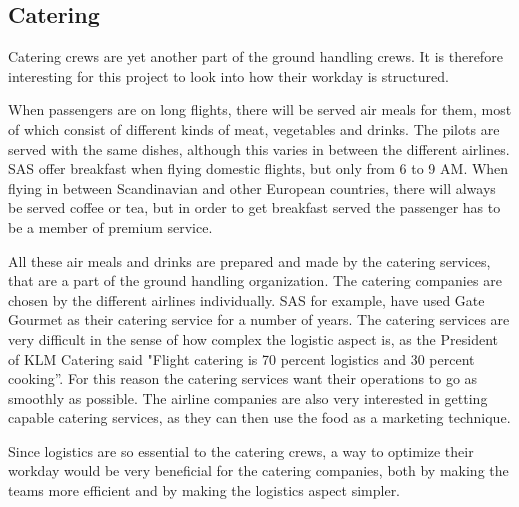 \subsection{Catering} 
Catering crews are yet another part of the ground handling crews. It is therefore interesting for this project to look into how their workday is structured.

When passengers are on long flights, there will be served air meals for them, most of which consist of different kinds of meat, vegetables and drinks. The pilots are served with the same dishes, although this varies in between the different airlines\cite{cate_pilotfood1}\cite{cate_pilotfood2}. SAS offer breakfast when flying domestic flights, but only from 6 to 9 AM\cite{cate_SASIndri}. When flying in between Scandinavian and other European countries, there will always be served coffee or tea, but in order to get breakfast served the passenger has to be a member of premium service\cite{cate_SASscanda}.

All these air meals and drinks are prepared and made by the catering services, that are a part of the ground handling organization. The catering companies are chosen by the different airlines individually. SAS for example, have used Gate Gourmet\cite{cate_SASGourmet} as their catering service for a number of years. The catering services are very difficult in the sense of how complex the logistic aspect is, as the President of KLM Catering said "Flight catering is 70 
percent logistics and 30 percent cooking”\cite{cate_BookSection}. For this reason the catering services want their operations to go as smoothly as possible. The airline companies are also very interested in getting capable catering services, as they can then use the food as a marketing technique\cite{cate_BookSection}. 

Since logistics are so essential to the catering crews, a way to optimize their workday would be very beneficial for the catering companies, both by making the teams more efficient and by making the logistics aspect simpler.